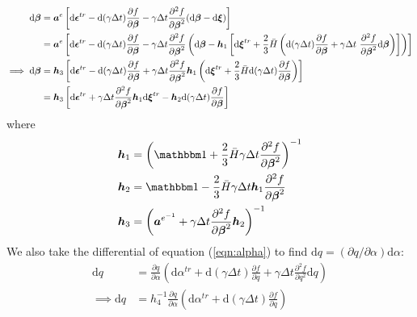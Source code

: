 \documentclass[10pt]{article}
\begin{document}
\begin{equation}
\begin{aligned}
\mathrm{d}\mbox{\boldmath$\beta$} &= \mbox{\boldmath$ a$}^e
\left[
 \mathrm{d}\mbox{\boldmath$\epsilon$}^{tr}
- \mathrm{d}(\gamma\Delta t)
\frac{\partial f}{\partial \mbox{\boldmath$\beta$}}
-\gamma\Delta t
\frac{\partial^2 f}{\partial \mbox{\boldmath$\beta$}^2}
(\mathrm{d}\mbox{\boldmath$\beta$}
- \mathrm{d}\mbox{\boldmath$\xi$})\right]\\
&= \mbox{\boldmath$ a$}^e
\left[
 \mathrm{d}\mbox{\boldmath$\epsilon$}^{tr}
- \mathrm{d}(\gamma\Delta t)
\frac{\partial f}{\partial \mbox{\boldmath$\beta$}}
-\gamma\Delta t
\frac{\partial^2 f}{\partial \mbox{\boldmath$\beta$}^2}
\left(\mathrm{d}\mbox{\boldmath$\beta$}
-
\mbox{\boldmath$ h$}_1
\left[
\mathrm{d}\mbox{\boldmath$\xi$}^{tr} + 
\frac{2}{3}\bar{H}\left(
\mathrm{d}(\gamma\Delta t)\frac{\partial f}{\partial\mbox{\boldmath$\beta$}}
+ 
\gamma\Delta t\
\frac{\partial^2 f}{\partial\mbox{\boldmath$\beta$}^2}
\mathrm{d}\mbox{\boldmath$\beta$}
\right)\right]
\right)\right]\\
\implies 
\mathrm{d}\mbox{\boldmath$\beta$}
&= 
\mbox{\boldmath$ h$}_3
\left[
 \mathrm{d}\mbox{\boldmath$\epsilon$}^{tr}
- \mathrm{d}(\gamma\Delta t)
\frac{\partial f}{\partial \mbox{\boldmath$\beta$}}
+\gamma\Delta t
\frac{\partial^2 f}{\partial \mbox{\boldmath$\beta$}^2}
\mbox{\boldmath$ h$}_1
\left(
\mathrm{d}\mbox{\boldmath$\xi$}^{tr} + 
\frac{2}{3}\bar{H}
\mathrm{d}(\gamma\Delta t)\frac{\partial f}{\partial\mbox{\boldmath$\beta$}}
\right)
\right]\\
&= 
\mbox{\boldmath$ h$}_3
\left[
 \mathrm{d}\mbox{\boldmath$\epsilon$}^{tr}
 +\gamma\Delta t
\frac{\partial^2 f}{\partial \mbox{\boldmath$\beta$}^2}
\mbox{\boldmath$ h$}_1
\mathrm{d}\mbox{\boldmath$\xi$}^{tr} 
- \mbox{\boldmath$ h$}_2
\mathrm{d}(\gamma\Delta t)\frac{\partial f}{\partial\mbox{\boldmath$\beta$}}
\right]
\label{eqn:dbeta2}
\end{aligned}
\end{equation}
where
\begin{equation}
\begin{aligned}
\bh_1 &=\left(\iso + \frac{2}{3}\bar{H}\gamma\Delta t\frac{\partial^2 f}{\partial\Bbeta^2}\right)^{-1}\\
\bh_2 &=\iso - \frac{2}{3}\bar{H}\gamma\Delta t\bh_1\frac{\partial^2 f}{\partial\Bbeta^2}\\
\bh_3 &=\left(\ba^{e^{-1}} +\gamma\Delta t\frac{\partial^2 f}{\partial \Bbeta^2}\bh_2\right)^{-1}
\end{aligned}
\end{equation}
We also take the differential of equation (\ref{eqn:alpha}) to find $\mathrm{d}q = (\partial q/\partial \alpha)\mathrm{d}\alpha$:
\begin{equation}
\begin{aligned}
\mathrm{d}q &= \frac{\partial q}{\partial \alpha}\left(
\mathrm{d}\alpha^{tr} + \mathrm{d}(\gamma\Delta t)
\frac{\partial f}{\partial q}
+ \gamma\Delta t \frac{\partial^2 f}{\partial q^2}\mathrm{d}q
\right)\\
\implies \mathrm{d}q &=h_4^{-1}
{\frac{\partial q}{\partial \alpha}\left(
\mathrm{d}\alpha^{tr} + \mathrm{d}(\gamma\Delta t)
\frac{\partial f}{\partial q}\right)}
\end{aligned}
\end{equation}
\end{document}
